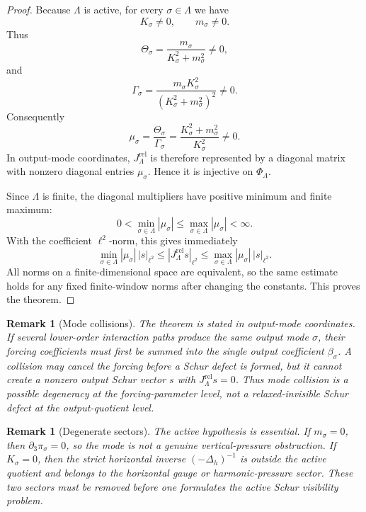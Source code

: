 \documentclass[11pt]{article}
\numberwithin{equation}{section}
\newtheorem{remark}[theorem]{Remark}
\begin{document}
\begin{proof}
Because \(\Lambda\) is active, for every \(\sigma\in\Lambda\) we have
\[
        K_\sigma\neq0,
        \qquad
        m_\sigma\neq0.
\]
Thus
\[
        \Theta_\sigma
        =\frac{m_\sigma}{K_\sigma^2+m_\sigma^2}
        \neq0,
\]
and
\[
        \Gamma_\sigma
        =\frac{m_\sigma K_\sigma^2}{(K_\sigma^2+m_\sigma^2)^2}
        \neq0.
\]
Consequently
\[
        \mu_\sigma
        =\frac{\Theta_\sigma}{\Gamma_\sigma}
        =\frac{K_\sigma^2+m_\sigma^2}{K_\sigma^2}
        \neq0.
\]
In output-mode coordinates, \(J_\Lambda^{\mathrm{rel}}\) is therefore represented by a diagonal matrix with nonzero diagonal entries \(\mu_\sigma\).  Hence it is injective on \(\Phi_\Lambda\).

Since \(\Lambda\) is finite, the diagonal multipliers have positive minimum and finite maximum:
\[
        0<\min_{\sigma\in\Lambda}|\mu_\sigma|
        \le
        \max_{\sigma\in\Lambda}|\mu_\sigma|
        <\infty.
\]
With the coefficient \(\ell^2\)-norm, this gives immediately
\[
        \min_{\sigma\in\Lambda}|\mu_\sigma|\,|s|_{\ell^2}
        \le
        |J_\Lambda^{\mathrm{rel}}s|_{\ell^2}
        \le
        \max_{\sigma\in\Lambda}|\mu_\sigma|\,|s|_{\ell^2}.
\]
All norms on a finite-dimensional space are equivalent, so the same estimate holds for any fixed finite-window norms after changing the constants.  This proves the theorem.
\end{proof}

\begin{remark}[Mode collisions]\label{rem:mode-collisions-finite-window}
The theorem is stated in output-mode coordinates.  If several lower-order interaction paths produce the same output mode \(\sigma\), their forcing coefficients must first be summed into the single output coefficient \(\beta_\sigma\).  A collision may cancel the forcing before a Schur defect is formed, but it cannot create a nonzero output Schur vector \(s\) with \(J_\Lambda^{\mathrm{rel}}s=0\).  Thus mode collision is a possible degeneracy at the forcing-parameter level, not a relaxed-invisible Schur defect at the output-quotient level.
\end{remark}

\begin{remark}[Degenerate sectors]\label{rem:degenerate-sectors-finite-window}
The active hypothesis is essential.  If \(m_\sigma=0\), then \(\partial_3\pi_\sigma=0\), so the mode is not a genuine vertical-pressure obstruction.  If \(K_\sigma=0\), then the strict horizontal inverse \(( -\Delta_h)^{-1}\) is outside the active quotient and belongs to the horizontal gauge or harmonic-pressure sector.  These two sectors must be removed before one formulates the active Schur visibility problem.
\end{remark}
\end{document}
